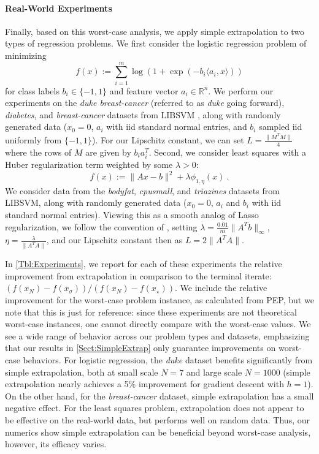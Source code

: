 \documentclass[11pt]{article}
\numberwithin{equation}{section}
\newcommand{\R}{\mathbb{R}}
\theoremstyle{definition}
\theoremstyle{definition}
\theoremstyle{definition}
\newcommand{\1}{\mathbf{1}}
\begin{document}
\paragraph{Real-World Experiments}
Finally, based on this worst-case analysis, we apply simple extrapolation to two types of regression problems. We first consider the logistic regression problem of minimizing
\begin{equation*}
    f(x) := \sum_{i=1}^m \log(1+\exp(-b_i \langle a_i, x \rangle ))
\end{equation*}
for class labels $b_i \in \{-1,1\}$ and feature vector $a_i \in \R^n$. We perform our experiments on the \textit{duke breast-cancer} (referred to as \textit{duke} going forward), \textit{diabetes}, and \textit{breast-cancer} datasets from LIBSVM \cite{LIBSVM}, along with randomly generated data ($x_0 = 0$, $a_i$ with iid standard normal entries, and $b_i$ sampled iid uniformly from $\{-1,1\}$). For our Lipschitz constant, we can set $L = \frac{\|M^T \! M\|}{4}$ where the rows of $M$ are given by $b_i a_i^T$.
Second, we consider least squares with a Huber regularization term weighted by some $\lambda > 0$:
\begin{equation*}
    f(x) := \|Ax-b\|^2 + \lambda \phi_{1,\eta}(x) \ .
\end{equation*}
We consider data from the \textit{bodyfat}, \textit{cpusmall}, and \textit{triazines} datasets from LIBSVM, along with randomly generated data ($x_0 = 0$, $a_i$ and $b_i$ with iid standard normal entries). Viewing this as a smooth analog of Lasso regularization, we follow the convention of \cite{Moreau_LassoConvention}, setting $\lambda = \frac{0.01}{m}\|A^T b\|_\infty$, $\eta = \frac{\lambda}{\|A^T \! A\|}$, and our Lipschitz constant then as $L = 2\|A^T \! A \|$. 

In \cref{Tbl:Experiments}, we report for each of these experiments the relative improvement from extrapolation in comparison to the terminal iterate: $(f(x_N) - f(x_\sigma))/(f(x_N) - f(x_\star))$. We include the relative improvement for the worst-case problem instance, as calculated from PEP, but we note that this is just for reference: since these experiments are not theoretical worst-case instances, one cannot directly compare with the worst-case values. We see a wide range of behavior across our problem types and datasets, emphasizing that our results in \cref{Sect:SimpleExtrap} only guarantee improvements on worst-case behaviors. For logistic regression, the \textit{duke} dataset benefits significantly from simple extrapolation, both at small scale $N=7$ and large scale $N=1000$ (simple extrapolation nearly achieves a 5\% improvement for gradient descent with $h=1$). On the other hand, for the \textit{breast-cancer} dataset, simple extrapolation has a small negative effect. For the least squares problem, extrapolation does not appear to be effective on the real-world data, but performs well on random data. Thus, our numerics show simple extrapolation can be beneficial beyond worst-case analysis, however, its efficacy varies.
\end{document}
